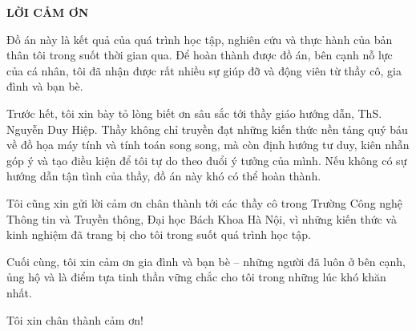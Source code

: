 \thispagestyle{empty}
\begin{center}
{\Large\bfseries LỜI CẢM ƠN}
\end{center}
\vspace{1cm}

Đồ án này là kết quả của quá trình học tập, nghiên cứu và thực hành của bản thân
tôi trong suốt thời gian qua. Để hoàn thành được đồ án, bên cạnh nỗ lực của cá
nhân, tôi đã nhận được rất nhiều sự giúp đỡ và động viên từ thầy cô, gia đình và
bạn bè.

Trước hết, tôi xin bày tỏ lòng biết ơn sâu sắc tới thầy giáo hướng dẫn, ThS.
Nguyễn Duy Hiệp. Thầy không chỉ truyền đạt những kiến thức nền tảng quý báu về đồ họa
máy tính và tính toán song song, mà còn định hướng tư duy, kiên nhẫn góp ý và tạo
điều kiện để tôi tự do theo đuổi ý tưởng của mình. Nếu không có sự hướng dẫn tận
tình của thầy, đồ án này khó có thể hoàn thành.

Tôi cũng xin gửi lời cảm ơn chân thành tới các thầy cô trong Trường Công nghệ
Thông tin và Truyền thông, Đại học Bách Khoa Hà Nội, vì những kiến thức và kinh
nghiệm đã trang bị cho tôi trong suốt quá trình học tập.

Cuối cùng, tôi xin cảm ơn gia đình và bạn bè -- những người đã luôn ở bên cạnh,
ủng hộ và là điểm tựa tinh thần vững chắc cho tôi trong những lúc khó khăn nhất.

Tôi xin chân thành cảm ơn!
